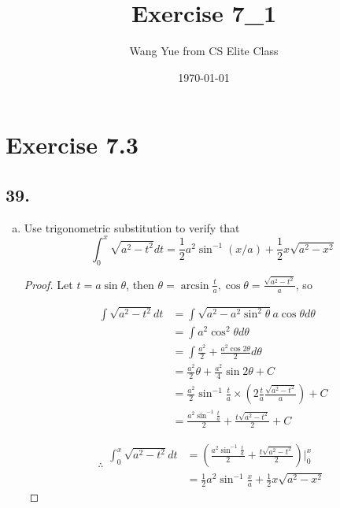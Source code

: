 \documentclass{article}
\begin{document}
    \title{Exercise 7\_1}
    \author{Wang Yue from CS Elite Class}
    \date{\today}
    \maketitle

    \section*{Exercise 7.3}

    \subsection*{39. }

    \begin{enumerate}[(a)]
        \item Use trigonometric substitution to verify that $$\int_0^x \sqrt{a^2 - t^2} dt = \frac 1 2 a^2 \sin^{-1}(x / a) + \frac 1 2 x \sqrt{a^2 - x^2}$$

        \begin{proof}

            Let $t = a\sin \theta$, then $\theta = \arcsin \frac t a, \cos \theta = \frac{\sqrt{a^2 - t^2}}{a}$, so

            $$\begin{aligned}
                \int \sqrt{a^2 - t^2} dt &= \int \sqrt{a^2 - a^2 \sin ^2 \theta} a \cos \theta d \theta \\
                &= \int a^2 \cos ^2 \theta d \theta \\
                &= \int \frac{a^2}{2} + \frac{a^2 \cos 2 \theta}{2} d \theta \\
                &= \frac{a^2}{2} \theta + \frac{a^2}{4} \sin 2\theta + C \\
                &= \frac{a^2}{2} \sin^{-1} \frac{t}{a} \times (2 \frac{t}{a} \frac{\sqrt{a^2 - t^2}}{a}) + C \\
                &= \frac{a^2\sin ^{-1} \frac t a}{2} + \frac{t \sqrt{a^2 - t^2}}{2} + C
            \end{aligned}$$

            $$\therefore \begin{aligned}
                \int_0^x \sqrt{a^2 - t^2} dt &= (\frac{a^2\sin ^{-1} \frac t a}{2} + \frac{t \sqrt{a^2 - t^2}}{2}) \biggl |_0^x \\
                &= \frac{1}{2} a^2 \sin^{-1} \frac x a + \frac 1 2 x \sqrt{a^2 - x^2}
            \end{aligned}$$
        \end{proof}


\end{enumerate}
\end{document}
